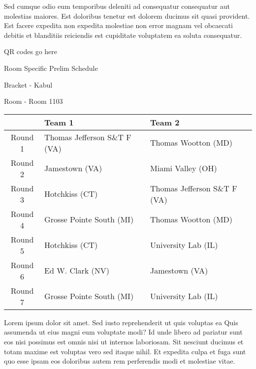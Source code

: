 \documentclass{article}%
\begin{document}
\newline%
Sed cumque odio eum temporibus deleniti ad consequatur consequatur aut molestias maiores. Est doloribus tenetur est dolorem ducimus sit quasi provident. Est facere expedita non expedita molestiae non error magnam vel obcaecati debitis et blanditiis reiciendis est cupiditate voluptatem ea soluta consequatur.%
\vspace*{140pt}%
\begin{center}%
\begin{Huge}%
QR codes go here%
\end{Huge}%
\end{center}%
\newpage%
\begin{center}%
\begin{Huge}%
Room Specific Prelim Schedule%
\end{Huge}%
\vspace*{8pt}%
\linebreak%
\begin{Large}%
Bracket {-} Kabul%
\end{Large}%
\vspace*{8pt}%
\linebreak%
\vspace*{8pt}%
\begin{Large}%
Room {-} Room 1103%
\end{Large}%
\end{center}%
%
\begin{tabularx}{\textwidth}{|c|Y|Y|}%
\hline%
&Team 1&Team 2\\%
\hline%
Round 1&Thomas Jefferson S\&T F (VA)&Thomas Wootton (MD)\\%
Round 2&Jamestown (VA)&Miami Valley (OH)\\%
Round 3&Hotchkiss (CT)&Thomas Jefferson S\&T F (VA)\\%
Round 4&Grosse Pointe South (MI)&Thomas Wootton (MD)\\%
Round 5&Hotchkiss (CT)&University Lab (IL)\\%
Round 6&Ed W. Clark (NV)&Jamestown (VA)\\%
Round 7&Grosse Pointe South (MI)&University Lab (IL)\\%
\hline%
\end{tabularx}%
\vspace*{8pt}%
\newline%
Lorem ipsum dolor sit amet. Sed iusto reprehenderit ut quis voluptas ea Quis assumenda ut eius magni eum voluptate modi? Id unde libero ad pariatur sunt eos nisi possimus est omnis nisi ut internos laboriosam. Sit nesciunt ducimus et totam maxime est voluptas vero sed itaque nihil. Et expedita culpa et fuga sunt quo esse ipsam eos doloribus autem rem perferendis modi et molestiae vitae.\newline%
\end{document}
